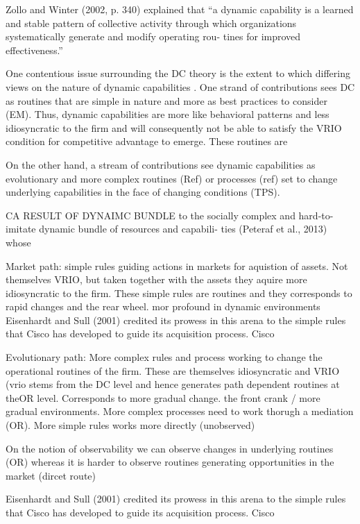 Zollo and Winter (2002, p. 340) explained that “a dynamic capability is a learned and stable pattern of collective activity through which organizations systematically generate and modify operating rou- tines for improved effectiveness.”



One contentious issue surrounding the DC theory is the extent to which differing
views on the nature of dynamic capabilities \citep{Peteraf2013}. One strand of
contributions sees DC as routines that are simple in nature and more as best practices to
consider (EM). Thus, dynamic capabilities are more like behavioral patterns and
less idiosyncratic to the firm and will consequently not be able to satisfy the VRIO
condition for competitive advantage to emerge. These routines are  

On the other hand, a stream of contributions see dynamic capabilities as evolutionary and
more complex routines (Ref) or processes (ref) set to change underlying capabilities in
the face of changing conditions (TPS).  

CA RESULT OF DYNAIMC BUNDLE
to the socially complex and hard-to- imitate dynamic bundle of resources and capabili- ties (Peteraf et al., 2013) whose



Market path: simple rules guiding actions in markets for aquistion of assets. Not
themselves VRIO, but taken together with the assets they aquire more idiosyncratic to the
firm. These simple rules are routines and they corresponds to rapid changes and the rear
wheel. mor profound in dynamic environments
Eisenhardt and Sull (2001) credited its prowess in this arena to the simple rules that Cisco has developed to guide its acquisition process. Cisco

Evolutionary path: More complex rules and process working to change the operational
routines of the firm. These are themselves idiosyncratic and VRIO (vrio stems from the DC
level and hence generates path dependent routines at theOR level. Corresponds to more
gradual change. the front crank / more gradual environments. More complex processes need
to work thorugh a mediation (OR). More simple rules works more directly (unobserved)

On the notion of observability we can observe changes in underlying routines (OR) whereas
it is harder to observe routines generating opportunities in the market (dircet route)


Eisenhardt and Sull (2001) credited its prowess in this arena to the simple rules that
Cisco has developed to guide its acquisition process. Cisco


